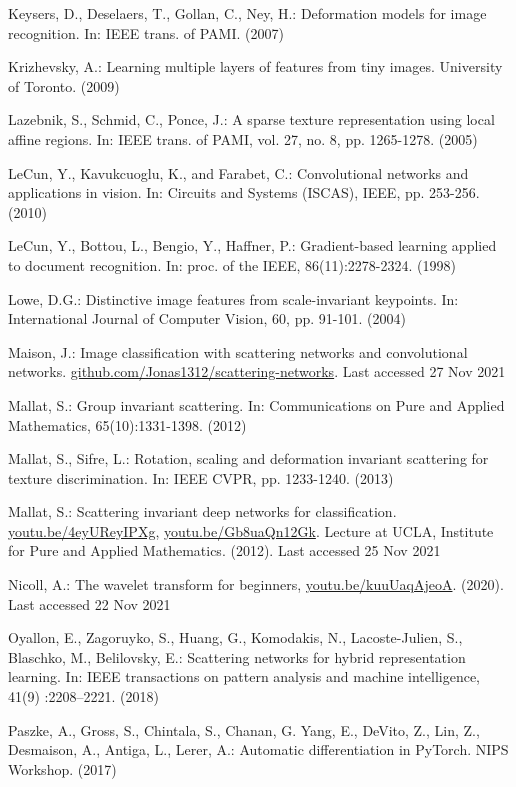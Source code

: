\documentclass[runningheads]{llncs}
\begin{document}
\begin{thebibliography}{8}
Keysers, D., Deselaers, T., Gollan, C., Ney, H.: Deformation models for image recognition. In: IEEE trans. of PAMI. (2007)

Krizhevsky, A.: Learning multiple layers of features from tiny images. University of Toronto. (2009)

Lazebnik, S., Schmid, C., Ponce, J.: A sparse texture representation using local affine regions. In: IEEE trans. of PAMI, vol. 27, no. 8, pp. 1265-1278. (2005)

LeCun, Y., Kavukcuoglu, K., and Farabet, C.: Convolutional networks and applications in vision. In: Circuits and Systems (ISCAS), IEEE, pp. 253-256. (2010)

LeCun, Y., Bottou, L., Bengio, Y., Haffner, P.: Gradient-based learning applied to document recognition. In: proc. of the IEEE, 86(11):2278-2324. (1998)

Lowe, D.G.: Distinctive image features from scale-invariant keypoints. In: International Journal of Computer Vision, 60, pp. 91-101. (2004)

Maison, J.: Image classification with scattering networks and convolutional networks. \url{github.com/Jonas1312/scattering-networks}. Last accessed 27 Nov 2021

Mallat, S.: Group invariant scattering. In: Communications on Pure and Applied Mathematics, 65(10):1331-1398. (2012)

Mallat, S., Sifre, L.: Rotation, scaling and deformation invariant scattering for texture discrimination. In: IEEE CVPR, pp. 1233-1240. (2013)

Mallat, S.: Scattering invariant deep networks for classification. \url{youtu.be/4eyUReyIPXg}, \url{youtu.be/Gb8uaQn12Gk}. Lecture at UCLA, Institute for Pure and Applied Mathematics. (2012). Last accessed 25 Nov 2021

Nicoll, A.: The wavelet transform for beginners, \url{youtu.be/kuuUaqAjeoA}. (2020). Last accessed 22 Nov 2021

Oyallon, E., Zagoruyko, S., Huang, G., Komodakis, N., Lacoste-Julien, S., Blaschko, M., Belilovsky, E.: Scattering networks for hybrid representation learning. In: IEEE transactions on pattern analysis and machine intelligence, 41(9) :2208–2221. (2018)

Paszke, A., Gross, S., Chintala, S., Chanan, G. Yang, E., DeVito, Z., Lin, Z., Desmaison, A., Antiga, L., Lerer, A.: Automatic differentiation in PyTorch. NIPS Workshop. (2017)


\end{thebibliography}
\end{document}
